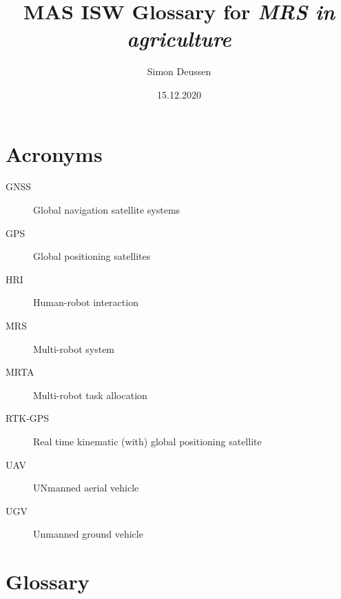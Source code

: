 \documentclass{article}
\title{MAS ISW Glossary for \emph{MRS in agriculture}}
\date{15.12.2020}
\author{Simon Deussen}
\begin{document}
\maketitle
{}


\section{Acronyms}

\begin{description}
    \item[GNSS] Global navigation satellite systems
    \item[GPS] Global positioning satellites
    \item[HRI] Human-robot interaction
    \item[MRS] Multi-robot system
    \item[MRTA] Multi-robot task allocation
    \item[RTK-GPS] Real time kinematic (with) global positioning satellite
    \item[UAV] UNmanned aerial vehicle
    \item[UGV] Unmanned ground vehicle
\end{description}

\section{Glossary}
\end{document}
